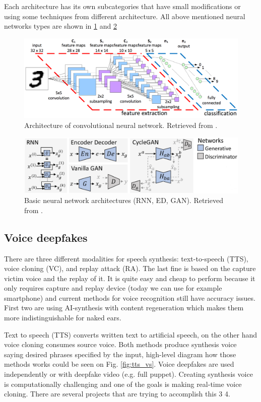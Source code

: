 Each architecture has its own subcategories that have small modifications or using some techniques from different architecture. All above mentioned neural networks types are shown in \ref{fig:nns_architecture} and \ref{fig:cnn_architecture} 

\begin{figure}[H]
    \centering
    \includegraphics[width=.7\linewidth]{other-fig/cnn.png}        
    \caption{Architecture of convolutional neural network. Retrieved from \cite{CNNArchitecture}.}
    \label{fig:nns_architecture}
\end{figure}

\begin{figure}[H]
    \centering
    \includegraphics[width=.65\linewidth]{other-fig/nns.png}        
    \caption{Basic neural network architectures (RNN, ED, GAN). Retrieved from \cite{CreationandDetectionofDeepfakes}.}
\label{fig:cnn_architecture}
\end{figure}

\subsection{Voice deepfakes}

There are three different modalities for speech synthesis: text-to-speech (TTS), voice cloning (VC), and replay attack (RA). \cite{Deepsonar} The last fine is based on the capture victim voice and the replay of it. It is quite easy and cheap to perform  because it only requires capture and replay device (today we can use for example smartphone) and current methods for voice recognition still have accuracy issues. \cite{ReplayAttackDetection} First two are using AI-synthesis with content regeneration which makes them more indistinguishable for naked ears. \cite{Deepsonar}

Text to speech (TTS) converts written text to artificial speech, on the other hand voice cloning consumes source voice. Both methods produce synthesis voice saying desired phrases specified by the input, high-level diagram how those methods works could be seen on Fig. \ref{fig:tts_vs}. Voice deepfakes are used independently or with deepfake video (e.g. full puppet). Creating synthesis voice is computationally challenging and one of the goals is making real-time voice cloning. There are several projects that are trying to accomplish this 3 4.


